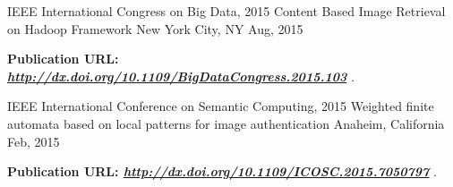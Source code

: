 

\begin{cventries}

  \cventry
    {IEEE International Congress on Big Data, 2015} %
    {Content Based Image Retrieval on Hadoop Framework} %
    {New York City, NY} %
    {Aug, 2015} %
    {
      \begin{cvitems} %
        \item {\textbf{Publication URL: \textit{\textbf{\url{http://dx.doi.org/10.1109/BigDataCongress.2015.103}}}} .}
      \end{cvitems}
    }

  \cventry
    {IEEE International Conference on Semantic Computing, 2015} %
    {Weighted finite automata based on local patterns for image authentication} %
    {Anaheim, California} %
    {Feb, 2015} %
    {
      \begin{cvitems} %
        \item {\textbf{Publication URL: \textit{\textbf{\url{http://dx.doi.org/10.1109/ICOSC.2015.7050797}}}} .}
      \end{cvitems}
    }

\end{cventries}


